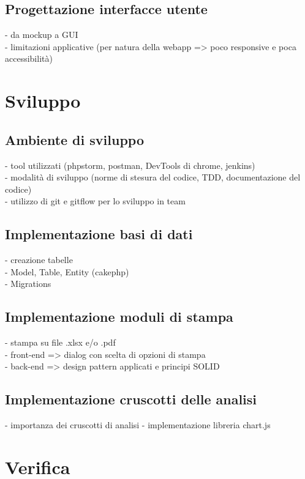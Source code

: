 \subsection{Progettazione interfacce utente}
- da mockup a GUI\\
- limitazioni applicative (per natura della webapp => poco responsive e poca accessibilità)\\

\section{Sviluppo}
\subsection{Ambiente di sviluppo}
- tool utilizzati (phpstorm, postman, DevTools di chrome, jenkins)\\
- modalità di sviluppo (norme di stesura del codice, TDD, documentazione del codice)\\
- utilizzo di git e gitflow per lo sviluppo in team\\
\subsection{Implementazione basi di dati}
- creazione tabelle \\
- Model, Table, Entity (cakephp)\\
- Migrations\\
\subsection{Implementazione moduli di stampa}
- stampa su file .xlsx e/o .pdf\\
- front-end => dialog con scelta di opzioni di stampa\\
- back-end => design pattern applicati e principi SOLID\\
\subsection{Implementazione cruscotti delle analisi}
- importanza dei cruscotti di analisi
- implementazione libreria chart.js

\section{Verifica}
